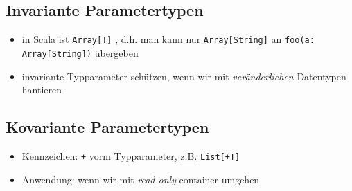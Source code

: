 \subsection{Invariante Parametertypen}
\begin{itemize}
  \item in Scala ist \texttt{Array[T]} , d.h. 
  man kann nur \texttt{Array[String]} an \texttt{foo(a: Array[String])}
  übergeben
  \item invariante Typparameter schützen, wenn wir mit
  \textit{veränderlichen} Datentypen hantieren
\end{itemize}


\subsection{Kovariante Parametertypen}
\begin{itemize}
  \item Kennzeichen: \texttt{+} vorm Typparameter, \uline{z.B.} 
  \texttt{List[+T]}
  \item Anwendung: wenn wir mit \textit{read-only} container umgehen
  
  
\end{itemize}




%
\begin{comment}
\addcontentsline{toc}{section}{Literatur}


\end{comment}

